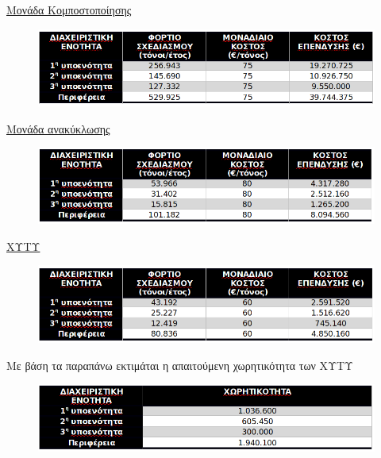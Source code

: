 \documentclass[12pt]{article}
\begin{document}
 	\underline{Μονάδα Κομποστοποίησης}
 	
 	\begin{figure} [H]
 		\begin{center}
 			\includegraphics [scale = 0.70] {table37.png}
 		\end{center}
 	\end{figure}
 
 	\underline{Μονάδα ανακύκλωσης}
 	
 	\begin{figure} [H]
 		\begin{center}
 			\includegraphics [scale = 0.70] {table38.png}
 		\end{center}
 	\end{figure}
 
 	\underline{ΧΥΤΥ}
 	
 	\begin{figure} [H]
 		\begin{center}
 			\includegraphics [scale = 0.70] {table39.png}
 		\end{center}
 	\end{figure}
 
 	Με βάση τα παραπάνω εκτιμάται η απαιτούμενη χωρητικότητα των ΧΥΤΥ
 	
 	\begin{figure} [H]
 		\begin{center}
 			\includegraphics [scale = 0.70] {table40.png}
 		\end{center}
 	\end{figure}
 
\end{document}
